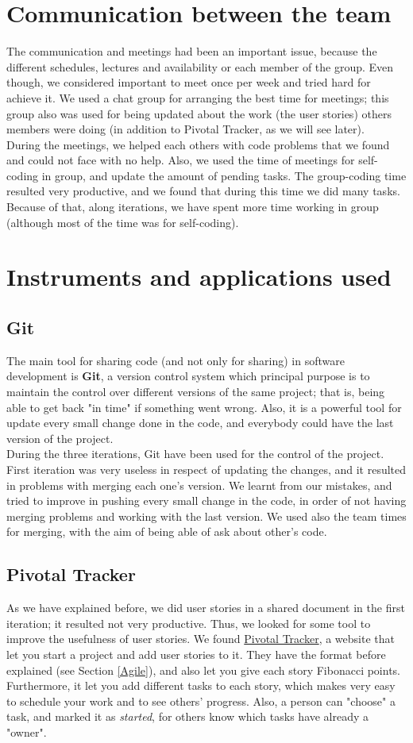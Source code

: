 \section{Communication between the team}
The communication and meetings had been an important issue, because the different schedules, lectures and availability or each member of the group. Even though, we considered important to meet once per week and tried hard for achieve it. We used a chat group for arranging the best time for meetings; this group also was used for being updated about the work (the user stories) others members were doing (in addition to Pivotal Tracker, as we will see later).\\
During the meetings, we helped each others with code problems that we found and could not face with no help. Also, we used the time of meetings for self-coding in group, and update the amount of pending tasks. The group-coding time resulted very productive, and we found that during this time we did many tasks. Because of that, along iterations, we have spent more time working in group (although most of the time was for self-coding).
\section{Instruments and applications used}
	\subsection{Git}
The main tool for sharing code (and not only for sharing) in software development is \textbf{Git}, a version control system which principal purpose is to maintain the control over different versions of the same project; that is, being able to get back "in time" if something went wrong. Also, it is a powerful tool for update every small change done in the code, and everybody could have the last version of the project.\\
During the three iterations, Git have been used for the control of the project. First iteration was very useless in respect of updating the changes, and it resulted in problems with merging each one's version. We learnt from our mistakes, and tried to improve in pushing every small change in the code, in order of not having merging problems and working with the last version. We used also the team times for merging, with the aim of being able of ask about other's code.
	\subsection{Pivotal Tracker} \label{Pivotal_Tracker}
As we have explained before, we did user stories in a shared document in the first iteration; it resulted not very productive. Thus, we looked for some tool to improve the usefulness of user stories. We found \href{https://www.pivotaltracker.com/}{Pivotal Tracker}, a website that let you start a project and add user stories to it. They have the format before explained (see Section \ref{Agile}), and also let you give each story Fibonacci points. Furthermore, it let you add different tasks to each story, which makes very easy to schedule your work and to see others' progress. Also, a person can "choose" a task, and marked it as \textit{started}, for others know which tasks have already a "owner".
